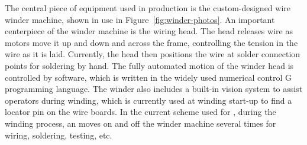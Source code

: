 \begin{comment}
A subset of procedures describing how to perform the step-by-step assembly of an \dword{apa} was originally created prior to the finalization of the \dword{pdsp} \dword{apa} series of drawings, and assigned drawing numbers. During subsequent assemblies, these instructions have evolved due to the addition of better tooling, fixtures, jigs and more complete drawing documents.  The process steps contained in each procedure have also been changed to create a better match with the B.O.M. (Bill Of Materials) contained on each finalized drawing level.  Table~\ref{tab:assembly-docs} lists what documents are available related to each assembly level.  Currently these documents are being revised to reflect the latest evolution of these procedures that were used to assemble US-\dword{apa}-4 for \dword{pdsp}.

\begin{dunetable}[\dword{apa} assembly documents]{lcc}{tab:assembly-docs}{Procedure documents for \dword{apa} assembly.}   
\dword{apa} Assembly Level & \textbf{Drawing No.} & \textbf{Assembly Instructions Doc.} \\ \toprowrule
\dword{apa} Frame Assembly & 8757 004 & 8752Doc001 \\ 
                   &          & 8752Doc002 \\ \colhline
Comb Base and Mesh & 8757 003 & 8752Doc003 \\
				   &          & 8752Doc004 \\ \colhline
Four Wire Layers   & 8757 002 & ~~~~~8752Doc005 (X) \\
                   &          & ~~~~~8752Doc006 (V) \\
                   &          & ~~~~~8752Doc007 (U) \\
                   &          & ~~~~~8752Doc008 (G) \\ \colhline
Factory \dword{apa}        & 8757 030 & 8752Doc009 \\
                   &          & 8752Doc010 \\ \colhline
Crating for Shipment & being finalized & being finalized \\
\end{dunetable}
\end{comment}

The central piece of equipment used in  production is the custom-designed wire winder machine, shown in use in Figure~\ref{fig:winder-photos}.  An important centerpiece of the winder machine is the wiring head.  The head releases wire as motors move it up and down and across the frame, controlling the tension in the wire as it is laid. Currently, the head then positions the wire at solder connection points for soldering by hand. The fully automated motion of the winder head is controlled by software, which is written in the widely used numerical control G programming language.  The winder also includes a built-in vision system to assist operators during winding, which is currently used at winding start-up to find a locator pin on the wire boards.  In the current scheme used for , during the winding process, an  moves on and off the winder machine several times for wiring, soldering, testing, etc.  

